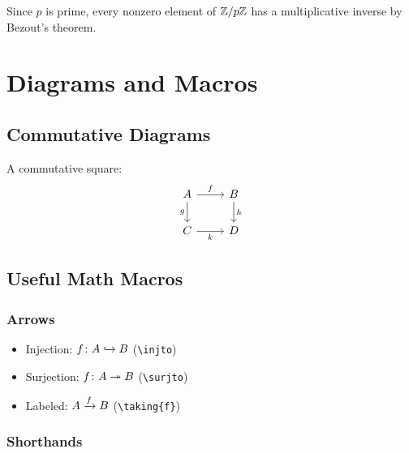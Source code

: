 \documentclass[11pt,oneside]{scrbook}
\begin{document}
\begin{soln}
    Since $p$ is prime, every nonzero element of $\mathbb{Z}/p\mathbb{Z}$ has a multiplicative
    inverse by Bezout's theorem.
\end{soln}

\chapter{Diagrams and Macros}

\section{Commutative Diagrams}

\begin{example}
    A commutative square:
\[
\begin{tikzcd}
    A \arrow[r, "f"] \arrow[d, "g"'] & B \arrow[d, "h"] \\
    C \arrow[r, "k"']                & D
\end{tikzcd}
\]
\end{example}

\section{Useful Math Macros}

\subsection{Arrows}

\begin{itemize}
    \item Injection: $f \colon A \hookrightarrow B$  \quad(\texttt{\textbackslash injto})
    \item Surjection: $f \colon A \twoheadrightarrow B$ \quad(\texttt{\textbackslash surjto})
    \item Labeled: $A \xrightarrow{f} B$          \quad(\texttt{\textbackslash taking\{f\}})
\end{itemize}

\subsection{Shorthands}
\end{document}
